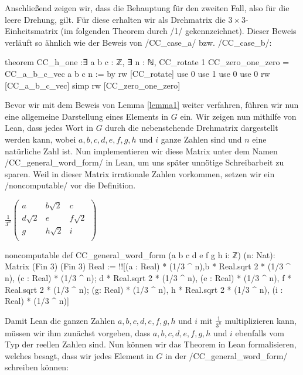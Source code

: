 \documentclass[10pt]{article}
\begin{document}
\noindent Anschließend zeigen wir, dass die Behauptung für den zweiten Fall, also für die leere Drehung, gilt. Für diese erhalten wir als Drehmatrix die $3\times 3$-Einheitsmatrix (im folgenden Theorem durch \lean/1/ gekennzeichnet). Dieser Beweis verläuft so ähnlich wie der Beweis von \lean/CC_case_a/ bzw. \lean/CC_case_b/:
\vspace{-0.1cm}
\begin{leancode}
theorem CC_h_one :∃ a b c : ℤ, ∃ n : ℕ, CC_rotate 1 CC_zero_one_zero = CC_a_b_c_vec a b c n := by
    rw [CC_rotate]
    use 0
    use 1
    use 0
    use 0
    rw [CC_a_b_c_vec]
    simp
    rw [CC_zero_one_zero]
\end{leancode}
\begin{minipage}{12cm}
\noindent Bevor wir mit dem Beweis von Lemma \ref{lemma1} weiter verfahren, führen wir nun eine allgemeine Darstellung eines Elements in $G$ ein. 
Wir zeigen nun mithilfe von Lean, dass jedes Wort in $G$ durch die nebenstehende Drehmatrix dargestellt werden kann, wobei $a,b,c,d,e,f,g,h$ und $i$ ganze Zahlen sind und $n$ eine natürliche Zahl ist. Nun implementieren wir diese Matrix unter dem Namen \lean/CC_general_word_form/ in Lean, um uns später unnötige Schreibarbeit zu sparen. Weil in dieser Matrix irrationale Zahlen vorkommen, setzen wir ein \lean/noncomputable/ vor die Definition.
\end{minipage}
\begin{minipage}{5cm}
\begin{center}
$\frac{1}{3^n}\begin{pmatrix}
    a & b\sqrt{2} & c \\
    d\sqrt{2} & e & f\sqrt{2} \\
    g & h\sqrt{2} & i \\
\end{pmatrix}$\label{matrix1}
\end{center}
\end{minipage}
\begin{leancode}
noncomputable def CC_general_word_form  
(a b c d e f g h i: ℤ) (n: Nat): Matrix (Fin 3) (Fin 3) Real :=
  !![(a : Real) * (1/3 ^ n),b * Real.sqrt 2 * (1/3 ^ n), (c : Real) * (1/3 ^ n);
    d * Real.sqrt 2 * (1/3 ^ n), (e : Real) * (1/3 ^ n), f * Real.sqrt 2 * (1/3 ^ n);
    (g: Real) * (1/3 ^ n), h * Real.sqrt 2 * (1/3 ^ n), (i : Real) * (1/3 ^ n)]
\end{leancode}
\noindent Damit Lean die ganzen Zahlen $a,b,c,d,e,f,g,h$ und $i$ mit $\frac{1}{3^n}$ multiplizieren kann, müssen wir ihm zunächst vorgeben, dass $a,b,c,d,e,f,g,h$ und $i$ ebenfalls vom Typ der reellen Zahlen sind. Nun können wir das Theorem in Lean formalisieren, welches besagt, dass wir jedes Element in $G$ in der \lean/CC_general_word_form/ schreiben können:
\end{document}
